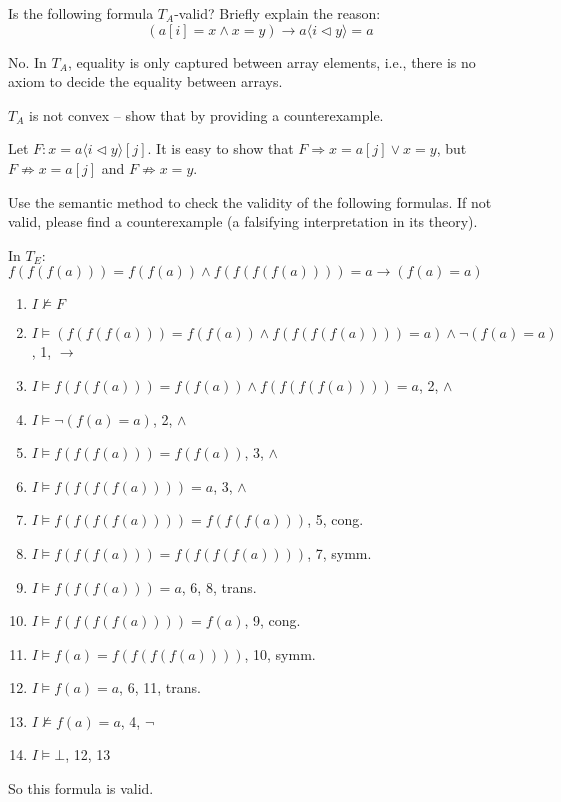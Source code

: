 \documentclass[11pt,a4paper]{article}
\newcommand{\upd}[2]{\langle #1 \triangleleft #2 \rangle}
\begin{document}
\subproblem Is the following formula $T_A$-valid? Briefly explain the reason:
$$(a[i] = x \land x = y) \to a \upd{i}{y} = a$$

\begin{solution}
    No. In $T_A$, equality is only captured between array elements, i.e., there is no axiom to decide the equality between arrays. 
\end{solution}

\subproblem $T_A$ is not convex -- show that by providing a counterexample.

\begin{solution}
    Let $F: x = a \upd{i}{y}[j]$. It is easy to show that $F \Rightarrow x = a[j] \lor x = y$, but $F \not\Rightarrow x = a[j]$ and $F \not\Rightarrow  x = y$.
\end{solution}

\newpage
{}

Use the semantic method to check the validity of the following formulas.
If not valid, please find a counterexample (a falsifying interpretation in its theory).

\subproblem In $T_E$: $f(f(f(a))) = f(f(a)) \land f(f(f(f(a)))) = a \to (f(a) = a)$

\begin{solution}
    \begin{enumerate}
      \item $I \not\models F$
      \item $I \models (f(f(f(a))) = f(f(a)) \land f(f(f(f(a)))) = a) \land \lnot (f(a) = a)$, 1, $\to$
      \item $I \models f(f(f(a))) = f(f(a)) \land f(f(f(f(a)))) = a$, 2, $\land$
      \item $I \models \lnot(f(a) = a)$, 2, $\land$
      \item $I \models f(f(f(a))) = f(f(a))$, 3, $\land$
      \item $I \models f(f(f(f(a)))) = a$, 3, $\land$
      \item $I \models f(f(f(f(a)))) = f(f(f(a)))$, 5, cong.
      \item $I \models f(f(f(a))) = f(f(f(f(a))))$, 7, symm.
      \item $I \models f(f(f(a))) = a$, 6, 8, trans.
      \item $I \models f(f(f(f(a)))) = f(a)$, 9, cong.
      \item $I \models f(a) = f(f(f(f(a))))$, 10, symm.
      \item $I \models f(a) = a$, 6, 11, trans.
      \item $I \not\models f(a) = a$, 4, $\lnot$
      \item $I \models \bot$, 12, 13
    \end{enumerate}
  
    So this formula is valid.
\end{solution}
\end{document}
